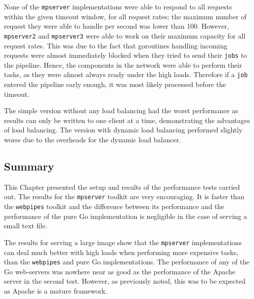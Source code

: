 None of the \texttt{mpserver} implementations were able to respond to all requests 
within the given timeout window, for all request rates; the maximum number 
of request they were able to handle per second was lower than 100. 
However, \texttt{mpserver2} and \texttt{mpserver3} were able to work on their maximum 
capacity for all request rates. This was due to 
the fact that goroutines handling incoming requests were almost immediately blocked
when they tried to send their \texttt{jobs} to the pipeline. Hence, the components 
in the network were able to perform their tasks, as they were almost always ready 
under the high loads. Therefore if a \texttt{job} entered the pipeline early enough,
it was most likely processed before the timeout.

The simple version without any load balancing had the worst performance as results 
can only be written to one client at a time, demonstrating the advantages of 
load balancing. The version with dynamic load balancing performed slightly worse due
to the overheads for the dynamic load balancer.

\subsection{Summary}
This Chapter presented the setup and results of the performance tests carried out.
The results for the \texttt{mpserver} toolkit are very encouraging. It is faster than
the \texttt{webpipes} toolkit and the difference between its performance and the performance
of the pure Go implementation is negligible in the case of serving a small text file.

The results for serving a large image show that the \texttt{mpserver} implementations can deal
much better with high loads when performing more expensive tasks, than the \texttt{webpipes} and
pure Go implementations. The performance of any of the Go web-servers was nowhere near as good
as the performance of the Apache server in the second test. However, as previously noted, this was to 
be expected as Apache is a mature framework.
